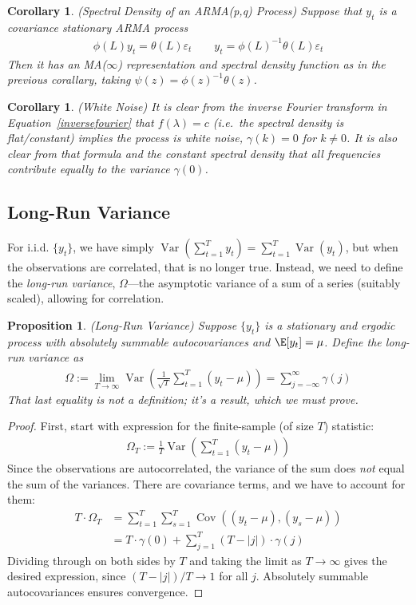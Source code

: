 \documentclass[12pt]{article}
\theoremstyle{plain}
\newtheorem{prop}[thm]{Proposition}
\newtheorem{cor}[thm]{Corollary}
\theoremstyle{definition}
\theoremstyle{remark}
\newcommand{\ra}{\rightarrow}
\newcommand{\Cov}{\operatorname{Cov}}
\newcommand{\Var}{\operatorname{Var}}
\newcommand{\sumtT}{\sum^T_{t=1}}
\newcommand{\limT}{\lim_{T\rightarrow\infty}}
\begin{document}
\begin{cor}\emph{(Spectral Density of an ARMA(p,q) Process)}
Suppose that $y_t$ is a covariance stationary ARMA process
\begin{align*}
  \phi(L) y_t = \theta(L)\varepsilon_t
  \qquad
  y_t = \phi(L)^{-1}\theta(L)\varepsilon_t
\end{align*}
Then it has an MA($\infty$) representation and spectral density
function as in the previous corallary, taking
$\psi(z) = \phi(z)^{-1}\theta(z)$.
\end{cor}



\begin{cor}\emph{(White Noise)}
It is clear from the inverse Fourier transform in
Equation~\ref{inversefourier} that $f(\lambda)=c$ (i.e.\ the spectral
density is flat/constant) implies the process is white noise,
$\gamma(k)=0$ for $k\neq 0$.
It is also clear from that formula and the constant spectral density
that \emph{all frequencies} contribute equally to the variance
$\gamma(0)$.
\end{cor}


\clearpage
\subsection{Long-Run Variance}

For i.i.d. $\{y_t\}$, we have simply $\Var(\sumtT y_t)=\sumtT\Var(y_t)$,
but when the observations are correlated, that is no longer true.
Instead, we need to define the \emph{long-run variance}, $\Omega$---the
asymptotic variance of a sum of a series (suitably scaled), allowing for
correlation.

\begin{prop}\emph{(Long-Run Variance)}
Suppose $\{y_t\}$ is a stationary and ergodic process with absolutely
summable autocovariances and $\E[y_t]=\mu$. Define the
\emph{long-run variance} as
\begin{align}
  \Omega
  := \limT \Var\left(\frac{1}{\sqrt{T}}\sumtT (y_t-\mu)\right)
  = \sum_{j=-\infty}^\infty \gamma(j)
  \label{clt:lrvar}
\end{align}
That last equality is not a definition; it's a result, which we must
prove.
\end{prop}
\begin{proof}
First, start with expression for the finite-sample (of size $T$)
statistic:
\begin{align*}
 \Omega_T
 := \frac{1}{T}\Var\left(\sumtT (y_t-\mu)\right)
\end{align*}
Since the observations are autocorrelated, the variance of the sum does
\emph{not} equal the sum of the variances. There are covariance terms,
and we have to account for them:
\begin{align*}
 T \cdot \Omega_T
 &= \sumtT \sum_{s=1}^T\Cov((y_t-\mu), (y_s-\mu)) \\
 &= T\cdot \gamma(0) + \sum_{j=1}^T (T-|j|)\cdot \gamma(j)
\end{align*}
Dividing through on both sides by $T$ and taking the limit as
$T\ra\infty$ gives the desired expression, since $(T-|j|)/T \ra 1$ for
all $j$. Absolutely summable autocovariances ensures convergence.
\end{proof}
\end{document}
